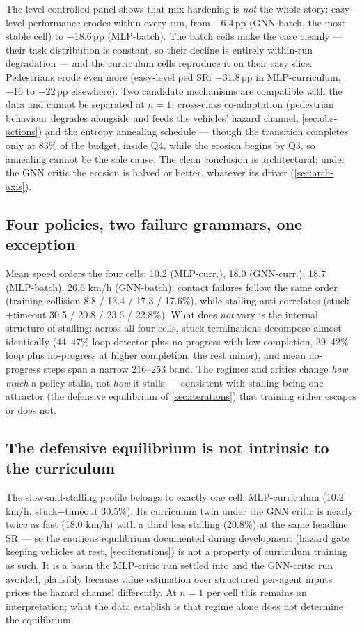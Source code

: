 The level-controlled panel shows that mix-hardening is \emph{not} the
whole story: easy-level performance erodes within every run, from
$-6.4$\,pp (GNN-batch, the most stable cell) to $-18.6$\,pp (MLP-batch).
The batch cells make the case cleanly --- their task distribution is
constant, so their decline is entirely within-run degradation --- and the
curriculum cells reproduce it on their easy slice. Pedestrians erode even
more (easy-level ped SR: $-31.8$\,pp in MLP-curriculum, $-16$ to
$-22$\,pp elsewhere). Two candidate mechanisms are compatible with the
data and cannot be separated at $n{=}1$: cross-class co-adaptation
(pedestrian behaviour degrades alongside and feeds the vehicles' hazard
channel, \cref{sec:obs-actions}) and the entropy annealing schedule ---
though the transition completes only at 83\% of the budget, inside Q4,
while the erosion begins by Q3, so annealing cannot be the sole cause.
The clean conclusion is architectural: under the GNN critic the erosion
is halved or better, whatever its driver (\cref{sec:arch-axis}).

\subsection{Four policies, two failure grammars, one exception}
\label{sec:failure-grammars}

Mean speed orders the four cells: 10.2 (MLP-curr.), 18.0 (GNN-curr.),
18.7 (MLP-batch), 26.6 km/h (GNN-batch); contact failures follow the
same order (training collision 8.8 / 13.4 / 17.3 / 17.6\%), while
stalling anti-correlates (stuck$+$timeout 30.5 / 20.8 / 23.6 / 22.8\%).
What does \emph{not} vary is the internal structure of stalling: across
all four cells, stuck terminations decompose almost identically
($44$--$47$\% loop-detector plus no-progress with low completion,
$39$--$42$\% loop plus no-progress at higher completion, the rest minor),
and mean no-progress steps span a narrow 216--253 band. The regimes and
critics change \emph{how much} a policy stalls, not \emph{how} it stalls
--- consistent with stalling being one attractor (the defensive
equilibrium of \cref{sec:iterations}) that training either escapes or
does not.

\subsection{The defensive equilibrium is not intrinsic to the curriculum}
\label{sec:defensive-case}

The slow-and-stalling profile belongs to exactly one cell:
MLP-curriculum (10.2 km/h, stuck$+$timeout 30.5\%). Its curriculum twin
under the GNN critic is nearly twice as fast (18.0 km/h) with a third
less stalling (20.8\%) at the same headline SR --- so the cautious
equilibrium documented during development (hazard gate keeping vehicles
at rest, \cref{sec:iterations}) is not a property of curriculum training
as such. It is a basin the MLP-critic run settled into and the GNN-critic
run avoided, plausibly because value estimation over structured per-agent
inputs prices the hazard channel differently. At $n{=}1$ per cell this
remains an interpretation; what the data establish is that regime alone
does not determine the equilibrium.

